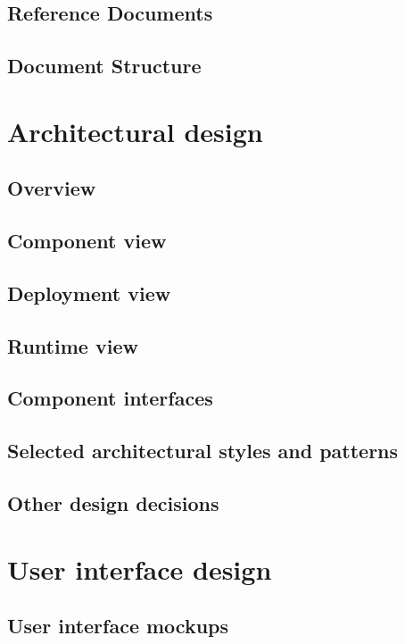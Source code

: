     \section{Reference Documents}
        
    \section{Document Structure}
    	
    
\newpage
\chapter{Architectural design}
    \section{Overview}
    	
    \section{Component view} \label{sec:components}
    	
    \section{Deployment view}
    	
    \section{Runtime view}
    	
    \section{Component interfaces}
    	
    \section{Selected architectural styles and patterns}
    	
    \section{Other design decisions}
\newpage
\chapter{User interface design}
	\section{User interface mockups}
		
\newpage
